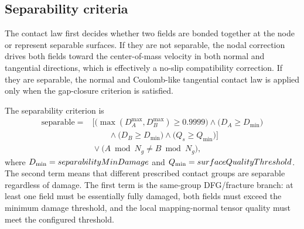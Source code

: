 \subsection{Separability criteria}
\label{subsec:contact-separability}

The contact law first decides whether two fields are bonded together at the node or represent separable surfaces.  If they are not separable, the nodal correction drives both fields toward the center-of-mass velocity in both normal and tangential directions, which is effectively a no-slip compatibility correction.  If they are separable, the normal and Coulomb-like tangential contact law is applied only when the gap-closure criterion is satisfied.

The separability criterion is
\begin{equation}
\begin{aligned}
  \mathrm{separable} ={}&
  \Big[\big(\max(D_A^{\max},D_B^{\max})\ge 0.9999\big)
  \land \big(D_A\ge D_{\min}\big) \\
  &\qquad {}
  \land \big(D_B\ge D_{\min}\big)
  \land \big(Q_s\ge Q_{\min}\big)\Big] \\
  &{}\lor \big(A\bmod N_g\ne B\bmod N_g\big),
  \label{eq:contact-separability}
\end{aligned}
\end{equation}
where $D_{\min}=separabilityMinDamage$ and $Q_{\min}=surfaceQualityThreshold$.  The second term means that different prescribed contact groups are separable regardless of damage.  The first term is the same-group DFG/fracture branch: at least one field must be essentially fully damaged, both fields must exceed the minimum damage threshold, and the local mapping-normal tensor quality must meet the configured threshold.

